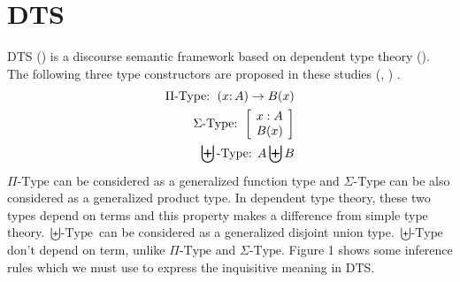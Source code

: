 \documentclass[a4paper,11pt, leqno]{article}
\begin{document}
\section{DTS\label{section:DTS}}
DTS (\citet{BekkiMineshima2016}) is a discourse semantic framework based on dependent type theory (\citet{martin1984intuitionistic}). The following three type constructors are proposed in these studies (\citet{BekkiMineshima2016}, \citet{ranta1994type}) .
\begin{align}
\Pi\mbox{-Type: }\dPi[x]{A}{B(x)}\\
\Sigma\mbox{-Type: }\dSigma[x]{A}{B(x)}\\
\biguplus\mbox{-Type: }\dOr{A}{B}
\end{align}
$\Pi\mbox{-Type}$ can be considered as a generalized function type and  $\Sigma\mbox{-Type}$ can be also considered as a generalized product type. In dependent type theory, these two types depend on terms and this property makes a difference from simple type theory. $\biguplus\mbox{-Type}$ can be considered as a generalized disjoint union type. $\biguplus\mbox{-Type}$ don't depend on term, unlike $\Pi\mbox{-Type}$ and $\Sigma\mbox{-Type}$. Figure 1 shows some inference rules which we must use to express the inquisitive meaning in DTS.
\end{document}
